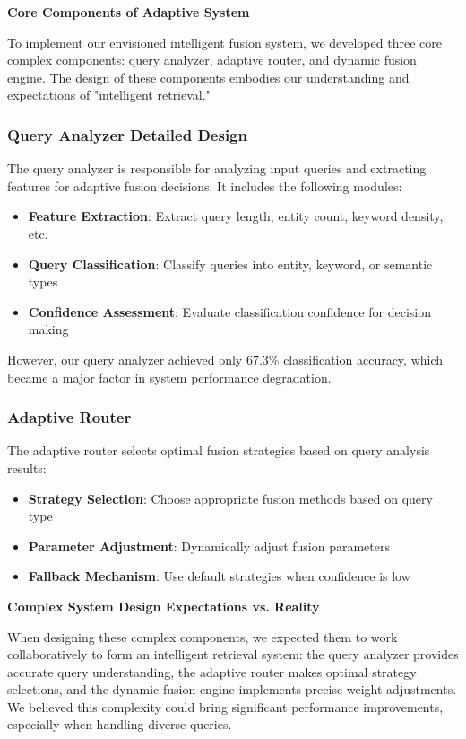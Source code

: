 \documentclass[letterpaper]{article} %
\begin{document}
\textbf{Core Components of Adaptive System}

To implement our envisioned intelligent fusion system, we developed three core complex components: query analyzer, adaptive router, and dynamic fusion engine. The design of these components embodies our understanding and expectations of "intelligent retrieval."

\subsubsection{Query Analyzer Detailed Design}

The query analyzer is responsible for analyzing input queries and extracting features for adaptive fusion decisions. It includes the following modules:

\begin{itemize}
\item \textbf{Feature Extraction}: Extract query length, entity count, keyword density, etc.
\item \textbf{Query Classification}: Classify queries into entity, keyword, or semantic types
\item \textbf{Confidence Assessment}: Evaluate classification confidence for decision making
\end{itemize}

However, our query analyzer achieved only 67.3\% classification accuracy, which became a major factor in system performance degradation.

\subsubsection{Adaptive Router}

The adaptive router selects optimal fusion strategies based on query analysis results:

\begin{itemize}
\item \textbf{Strategy Selection}: Choose appropriate fusion methods based on query type
\item \textbf{Parameter Adjustment}: Dynamically adjust fusion parameters
\item \textbf{Fallback Mechanism}: Use default strategies when confidence is low
\end{itemize}

\textbf{Complex System Design Expectations vs. Reality}

When designing these complex components, we expected them to work collaboratively to form an intelligent retrieval system: the query analyzer provides accurate query understanding, the adaptive router makes optimal strategy selections, and the dynamic fusion engine implements precise weight adjustments. We believed this complexity could bring significant performance improvements, especially when handling diverse queries.
\end{document}
